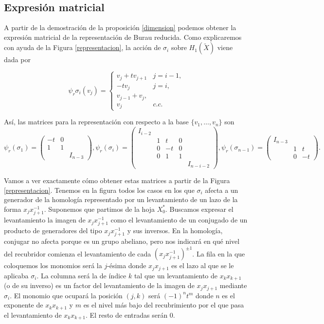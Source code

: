 \documentclass[TFG.tex]{subfiles}
\begin{document}
\subsection{Expresión matricial}
A partir de la demostración de la proposición \ref{dimension} podemos obtener la expresión matricial de la representación de Burau reducida. Como explicaremos con ayuda de la Figura \ref{representacion}, la acción de $\sigma_i$ sobre $H_1(\widetilde{X})$ viene dada por

\[
\psi_r\sigma_i(v_j)=\begin{cases}
v_j+tv_{j+1} & j=i-1,\\
-tv_j & j=i,\\
v_{j-1}+v_j,\\
v_j & c.c.
\end{cases}
\]

Así, las matrices para la representación con respecto a la base $\{v_1,\dots, v_n\}$ son
\[
\psi_r(\sigma_1)=\begin{pmatrix}
-t & 0 & \\
1 & 1 & \\
& & I_{n-3}
\end{pmatrix},\psi_r(\sigma_i )=\begin{pmatrix}
I_{i-2} & & &\\
& 1 & t & 0 & \\
& 0 & -t & 0 & \\
& 0 & 1 & 1 & \\
& & & & I_{n-i-2}  
\end{pmatrix}, \psi_r(\sigma_{n-1})=\begin{pmatrix}
I_{n-3} & &\\
& 1 & t \\
& 0 & -t 
\end{pmatrix}.
\]

Vamos a ver exactamente cómo obtener estas matrices a partir de la Figura \ref{representacion}. Tenemos en la figura todos los casos en los que $\sigma_i$ afecta a un generador de la homología representado por un levantamiento de un lazo de la forma $x_jx_{j+1}^{-1}$. Suponemos que partimos de la hoja $X^*_0$. Buscamos expresar el levantamiento la imagen de $x_jx_{j+1}^{-1}$ como el levantamiento de un conjugado de un producto de generadores del tipo $x_jx_{j+1}^{-1}$ y sus inversos. En la homología, conjugar no afecta porque es un grupo abeliano, pero nos indicará en qué nivel del recubridor comienza el levantamiento de cada $(x_jx_{j+1}^{-1})^{\pm 1}$. La fila en la que coloquemos los monomios será la $j$-ésima donde $x_jx_{j+1}$ es el lazo al que se le aplicaba $\sigma_i$. La columna será la de índice $k$ tal que un levantamiento de $x_kx_{k+1}$ (o de su inverso) es un factor del levantamiento de la imagen de $x_jx_{j+1}$ mediante $\sigma_i$. El monomio que ocupará la posición $(j,k)$ será $(-1)^nt^m$ donde $n$ es el exponente de $x_kx_{k+1}$ y $m$ es el nivel más bajo del recubrimiento por el que pasa el levantamiento de $x_kx_{k+1}$. El resto de entradas serán 0.
\end{document}
